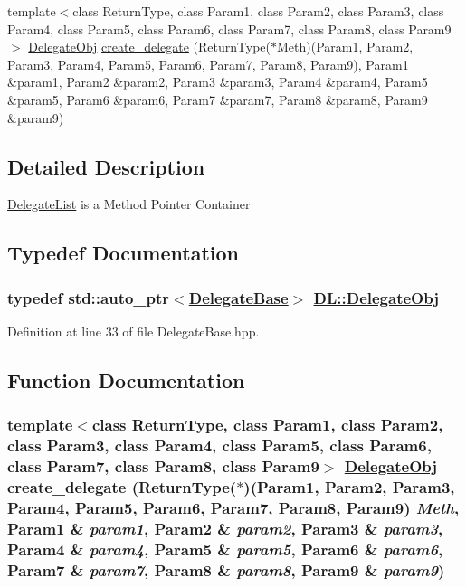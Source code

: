 \begin{CompactItemize}
\item 
template$<$class Return\-Type, class Param1, class Param2, class Param3, class Param4, class Param5, class Param6, class Param7, class Param8, class Param9$>$ \hyperlink{namespaceDL_a0}{Delegate\-Obj} \hyperlink{namespaceDL_a33}{create\_\-delegate} (Return\-Type($\ast$Meth)(Param1, Param2, Param3, Param4, Param5, Param6, Param7, Param8, Param9), Param1 \&param1, Param2 \&param2, Param3 \&param3, Param4 \&param4, Param5 \&param5, Param6 \&param6, Param7 \&param7, Param8 \&param8, Param9 \&param9)
\end{CompactItemize}


\subsection{Detailed Description}
\hyperlink{classDL_1_1DelegateList}{Delegate\-List} is a Method Pointer Container 



\subsection{Typedef Documentation}
\hypertarget{namespaceDL_a0}{
\subsubsection[DelegateObj]{\setlength{\rightskip}{0pt plus 5cm}typedef std::auto\_\-ptr$<$\hyperlink{classDL_1_1DelegateBase}{Delegate\-Base}$>$ \hyperlink{namespaceDL_a0}{DL::Delegate\-Obj}}}
\label{namespaceDL_a0}




Definition at line 33 of file Delegate\-Base.hpp.

\subsection{Function Documentation}
\hypertarget{namespaceDL_a33}{
\subsubsection[create\_\-delegate]{\setlength{\rightskip}{0pt plus 5cm}template$<$class Return\-Type, class Param1, class Param2, class Param3, class Param4, class Param5, class Param6, class Param7, class Param8, class Param9$>$ \hyperlink{namespaceDL_a0}{Delegate\-Obj} create\_\-delegate (Return\-Type($\ast$)(Param1, Param2, Param3, Param4, Param5, Param6, Param7, Param8, Param9) {\em Meth}, Param1 \& {\em param1}, Param2 \& {\em param2}, Param3 \& {\em param3}, Param4 \& {\em param4}, Param5 \& {\em param5}, Param6 \& {\em param6}, Param7 \& {\em param7}, Param8 \& {\em param8}, Param9 \& {\em param9})}}
\label{namespaceDL_a33}




